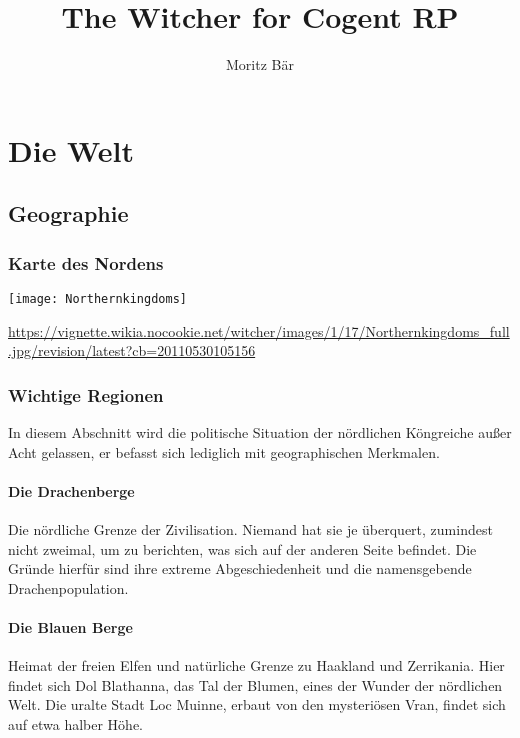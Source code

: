 \documentclass[parskip=full,11pt]{scrreport}
\title{The Witcher for Cogent RP}
\author{Moritz Bär}
\begin{document}
\makeatletter



\maketitle
\setcounter{tocdepth}{1}
\tableofcontents

\iffalse %
	\chapter{Die Welt}

	\section{Geographie}
	\subsection{Karte des Nordens}
	\texttt{[image: Northernkingdoms]}
	\begin{tiny}\url{https://vignette.wikia.nocookie.net/witcher/images/1/17/Northernkingdoms_full.jpg/revision/latest?cb=20110530105156}\end{tiny}
	\subsection{Wichtige Regionen}
	In diesem Abschnitt wird die politische Situation der nördlichen Köngreiche außer Acht gelassen, er befasst sich lediglich mit geographischen Merkmalen.
	\subsubsection{Die Drachenberge}
	Die nördliche Grenze der Zivilisation. Niemand hat sie je überquert, zumindest nicht zweimal, um zu berichten, was sich auf der anderen Seite befindet. Die Gründe hierfür sind ihre extreme Abgeschiedenheit und die namensgebende Drachenpopulation.

	\subsubsection{Die Blauen Berge}
	Heimat der freien Elfen und natürliche Grenze zu Haakland und Zerrikania. Hier findet sich Dol Blathanna, das Tal der Blumen, eines der Wunder der nördlichen Welt. Die uralte Stadt Loc Muinne, erbaut von den mysteriösen Vran, findet sich auf etwa halber Höhe.
\end{document}
